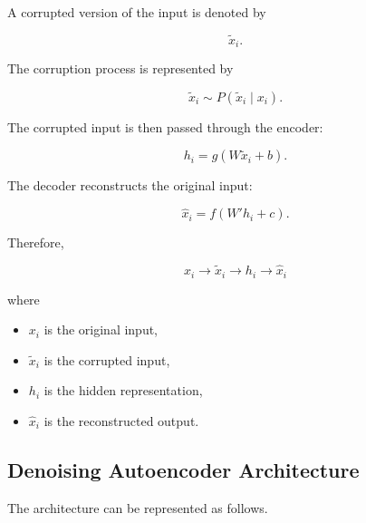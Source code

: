 \documentclass{article}
\begin{document}
A corrupted version of the input is denoted by

\[
\widetilde{x}_i.
\]

The corruption process is represented by

\[
\widetilde{x}_i
\sim
P(\widetilde{x}_i\mid x_i).
\]

The corrupted input is then passed through the encoder:

\[
h_i
=
g(W\widetilde{x}_i+b).
\]

The decoder reconstructs the original input:

\[
\widehat{x}_i
=
f(W'h_i+c).
\]

Therefore,

\[
\boxed{
	x_i
	\longrightarrow
	\widetilde{x}_i
	\longrightarrow
	h_i
	\longrightarrow
	\widehat{x}_i
}
\]

where

\begin{itemize}
	\item \(x_i\) is the original input,
	\item \(\widetilde{x}_i\) is the corrupted input,
	\item \(h_i\) is the hidden representation,
	\item \(\widehat{x}_i\) is the reconstructed output.
\end{itemize}


\subsection{Denoising Autoencoder Architecture}

The architecture can be represented as follows.
\end{document}
